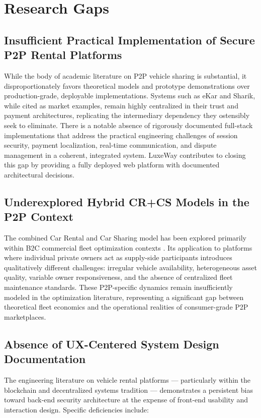 \section{Research Gaps}

\subsection{Insufficient Practical Implementation of Secure P2P Rental Platforms}

While the body of academic literature on P2P vehicle sharing is substantial, it disproportionately favors theoretical models and prototype demonstrations over production-grade, deployable implementations. Systems such as eKar and Sharik, while cited as market examples, remain highly centralized in their trust and payment architectures, replicating the intermediary dependency they ostensibly seek to eliminate. There is a notable absence of rigorously documented full-stack implementations that address the practical engineering challenges of session security, payment localization, real-time communication, and dispute management in a coherent, integrated system. LuxeWay contributes to closing this gap by providing a fully deployed web platform with documented architectural decisions.

\subsection{Underexplored Hybrid CR+CS Models in the P2P Context}

The combined Car Rental and Car Sharing model has been explored primarily within B2C commercial fleet optimization contexts \cite{soppert2024benefit}. Its application to platforms where individual private owners act as supply-side participants introduces qualitatively different challenges: irregular vehicle availability, heterogeneous asset quality, variable owner responsiveness, and the absence of centralized fleet maintenance standards. These P2P-specific dynamics remain insufficiently modeled in the optimization literature, representing a significant gap between theoretical fleet economics and the operational realities of consumer-grade P2P marketplaces.

\subsection{Absence of UX-Centered System Design Documentation}

The engineering literature on vehicle rental platforms --- particularly within the blockchain and decentralized systems tradition --- demonstrates a persistent bias toward back-end security architecture at the expense of front-end usability and interaction design. Specific deficiencies include:

